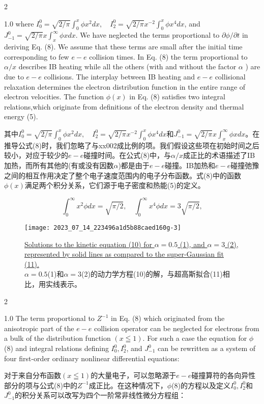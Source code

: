 \documentclass[oneside,onecolumn]{article}
\newcommand\enzhbox[2]{
	\quad\par \begin{paracol}{2} 
			\begin{spacing}{1.0}
					\footnotesize  #1
			\end{spacing}
			
		\switchcolumn[1] 
		#2
	\end{paracol} 
}
\begin{document}
\begin{sloppypar}
\enzhbox{  where $I_{0}^{0}=\sqrt{2 / \pi} \int_{0}^{x} \phi x^{2} d x, \quad I_{2}^{0}=\sqrt{2 / \pi} x^{-2} \int_{0}^{x} \phi x^{4} d x$, and $J_{-1}^{0}=\sqrt{2 / \pi} x \int_{x}^{\infty} \phi x d x$. We have neglected the terms proportional to $\partial \phi / \partial t$ in deriving Eq. (8). We assume that these terms are small after the initial time corresponding to few $e-e$ collision times. In Eq. (8) the term proportional to $\alpha / x$ describes IB heating while all the others (with and without the factor $\alpha$ ) are due to $e-e$ collisions. The interplay between IB heating and $e-e$ collisional relaxation determines the electron distribution function in the entire range of electron velocities. The function $\phi(x)$ in Eq. (8) satisfies two integral relations,which originate from definitions of the electron density and thermal energy (5).
}{
其中$I_{0}^{0}=\sqrt{2 / \pi} \int_{0}^{x} \phi x^{2} d x, \quad I_{2}^{0}=\sqrt{2 / \pi} x^{-2} \int_{0}^{x} \phi x^{4} d x$和$J_{-1}^{0}=\sqrt{2 / \pi} x \int_{x}^{\infty} \phi x d x$。在推导公式(8)时，我们忽略了与xx002成比例的项。我们假设这些项在初始时间之后较小，对应于较少的$e-e$碰撞时间。在公式(8)中，与$\alpha / x$成正比的术语描述了IB加热，而所有其他的(有或没有因数$\alpha$)都是由于$e-e$碰撞。IB加热和$e-e$碰撞弛豫之间的相互作用决定了整个电子速度范围内的电子分布函数。式(8)中的函数$\phi(x)$满足两个积分关系，它们源于电子密度和热能(5)的定义。
}
  
  \begin{equation}
  \int_{0}^{\infty} x^{2} \phi d x=\sqrt{\pi / 2}, \quad \int_{0}^{\infty} x^{4} \phi d x=3 \sqrt{\pi / 2},
  \end{equation}
  
  \begin{figure}[tbp]
  	\centering
  	\texttt{[image: 2023\_07\_14\_223496a1d5b88caed160g-3]}
  	\caption{\uline{Solutions to the kinetic equation (10) for $\alpha=0.5$ (1), and $\alpha=3$ (2), represented by solid lines as compared to the super-Gaussian fit (11).}\\$\alpha=0.5$(1)和$\alpha=3$(2)的动力学方程(10)的解，与超高斯拟合(11)相比，用实线表示。}
  	\label{figure1}
  \end{figure}

  

\enzhbox{  The term proportional to $Z^{-1}$ in Eq. (8) which originated from the anisotropic part of the $e-e$ collision operator can be neglected for electrons from a bulk of the distribution function $(x \leqq 1)$. For such a case the equation for $\phi$ (8) and integral relations defining $I_{0}^{0}, I_{2}^{0}$, and $J_{-1}^{0}$ can be rewritten as a system of four first-order ordinary nonlinear differential equations:
}{
对于来自分布函数$(x \leqq 1)$的大量电子，可以忽略源于$e-e$碰撞算符的各向异性部分的项与公式(8)中的$Z^{-1}$成正比。在这种情况下，$\phi$(8)的方程以及定义$I_{0}^{0}, I_{2}^{0}$和$J_{-1}^{0}$的积分关系可以改写为四个一阶常非线性微分方程组：
}


\end{sloppypar}
\end{document}
